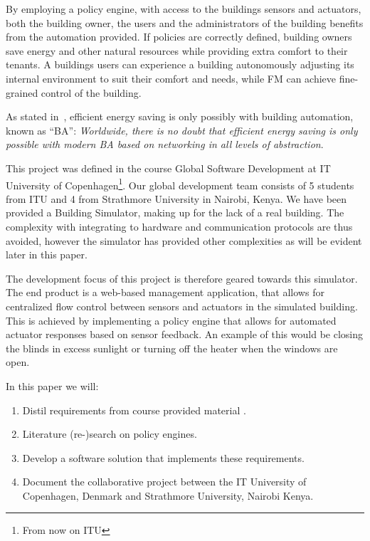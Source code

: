 By employing a policy engine, with access to the buildings sensors and actuators, both the building owner, the users and the administrators of the building benefits from the automation provided. If policies are correctly defined, building owners save energy and other natural resources while providing extra comfort to their tenants. A buildings users can experience a building autonomously adjusting its internal environment to suit their comfort and needs, while FM can achieve fine-grained control of the building.

As stated in~\cite{ba-short}, efficient energy saving is only possibly with building automation, known as ``BA'': \textit{Worldwide, there is no doubt that efficient energy saving is only possible with modern BA based on networking in all levels of abstraction}.

This project was defined in the course Global Software Development at IT University of Copenhagen\footnote{From now on ITU}. Our global development team consists of 5 students from ITU and 4 from Strathmore University in Nairobi, Kenya. We have been provided a Building Simulator, making up for the lack of a real building. The complexity with integrating to hardware and communication protocols are thus avoided, however the simulator has provided other complexities as will be evident later in this paper. 

The development focus of this project is therefore geared towards this simulator. The end product is a web-based management application, that allows for centralized flow control between sensors and actuators in the simulated building. This is achieved by implementing a policy engine that allows for automated actuator responses based on sensor feedback. An example of this would be closing the blinds in excess sunlight or turning off the heater when the windows are open.

In this paper we will: 
\begin{enumerate}
	\item Distil requirements from course provided material .
	\item Literature (re-)search on policy engines.
	\item Develop a software solution that implements these requirements.
	\item Document the collaborative project between the IT University of Copenhagen, Denmark and Strathmore University, Nairobi Kenya.
\end{enumerate}

